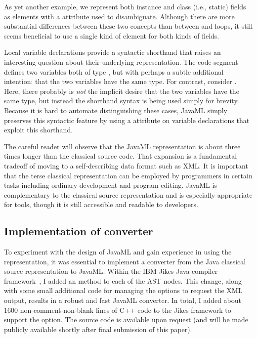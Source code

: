 \documentclass{article}
\begin{document}
      
As yet another example, we represent both instance and class (i.e.,
static) fields as  elements with a 
attribute used to disambiguate.  Although there are more substantial
differences between these two concepts than between 
and  loops, it still seems beneficial to use a single
kind of element for both kinds of fields.

Local variable declarations provide a syntactic shorthand that raises an
interesting question about their underlying representation.  The code
segment  defines two variables both of type
, but with perhaps a subtle additional intention: that the
two variables have the same type.  For contrast, consider .  Here, there probably is \emph{not} the implicit desire
that the two variables have the same type, but instead the shorthand
syntax is being used simply for brevity.  Because it is hard to automate
distinguishing these cases, JavaML simply preserves this syntactic
feature by using a  attribute on variable
declarations that exploit this shorthand.

The careful reader will observe that the JavaML representation is about
three times longer than the classical source code.  That expansion is a
fundamental tradeoff of moving to a self-describing data format such as
XML.  It is important that the terse classical representation can be
employed by programmers in certain tasks including ordinary development
and program editing.  JavaML is complementary to the classical source
representation and is especially appropriate for tools, though it is
still accessible and readable to developers.

\subsection{Implementation of converter}

To experiment with the design of JavaML and gain experience in using the
representation, it was essential to implement a converter from the Java
classical source representation to JavaML.  Within the IBM Jikes Java
compiler framework~\cite{Jikes}, I added an  method
to each of the AST nodes. This change, along with some small additional
code for managing the options to request the XML output, results in a
robust and fast JavaML converter.  In total, I added about 1600
non-comment-non-blank lines of C++ code to the Jikes framework to
support the option.  The source code is available upon request (and will
be made publicly available shortly after final submission of this
paper).
\end{document}
